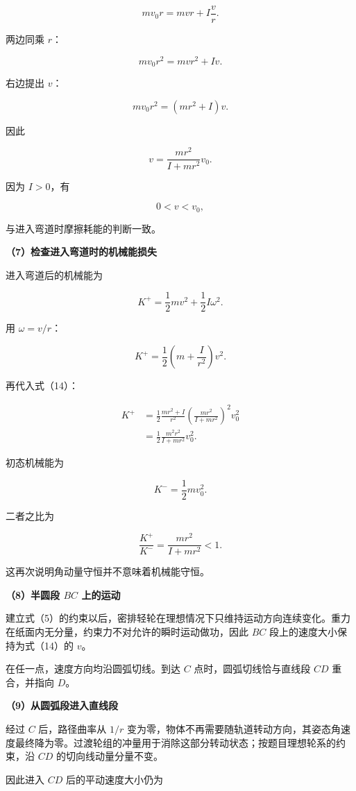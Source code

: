 \documentclass[12pt,a4paper,UTF8]{ctexart}
\begin{document}
\[
mv_0r=mvr+I\frac vr.
\tag{11}
\]

两边同乘 \(r\)：

\[
mv_0r^2=mvr^2+Iv.
\tag{12}
\]

右边提出 \(v\)：

\[
mv_0r^2=(mr^2+I)v.
\tag{13}
\]

因此

\[
\boxed{
v=\frac{mr^2}{I+mr^2}v_0
}.
\tag{14}
\]

因为 \(I>0\)，有

\[
0<v<v_0,
\]

与进入弯道时摩擦耗能的判断一致。

\textbf{（7）检查进入弯道时的机械能损失}

进入弯道后的机械能为

\[
K^+
=\frac12mv^2+\frac12I\omega^2.
\tag{15}
\]

用 \(\omega=v/r\)：

\[
K^+
=\frac12\left(m+\frac I{r^2}\right)v^2.
\tag{16}
\]

再代入式（14）：

\[
\begin{aligned}
K^+
&=\frac12\frac{mr^2+I}{r^2}
\left(\frac{mr^2}{I+mr^2}\right)^2v_0^2\\
&=\frac12
\frac{m^2r^2}{I+mr^2}v_0^2.
\end{aligned}
\tag{17}
\]

初态机械能为

\[
K^-=\frac12mv_0^2.
\tag{18}
\]

二者之比为

\[
\frac{K^+}{K^-}
=\frac{mr^2}{I+mr^2}<1.
\tag{19}
\]

这再次说明角动量守恒并不意味着机械能守恒。

\textbf{（8）半圆段 \(BC\) 上的运动}

建立式（5）的约束以后，密排轻轮在理想情况下只维持运动方向连续变化。重力在纸面内无分量，约束力不对允许的瞬时运动做功，因此
\(BC\) 段上的速度大小保持为式（14）的 \(v\)。

在任一点，速度方向均沿圆弧切线。到达 \(C\) 点时，圆弧切线恰与直线段
\(CD\) 重合，并指向 \(D\)。

\textbf{（9）从圆弧段进入直线段}

经过 \(C\) 后，路径曲率从 \(1/r\)
变为零，物体不再需要随轨道转动方向，其姿态角速度最终降为零。过渡轮组的冲量用于消除这部分转动状态；按题目理想轮系的约束，沿
\(CD\) 的切向线动量分量不变。

因此进入 \(CD\) 后的平动速度大小仍为
\end{document}
